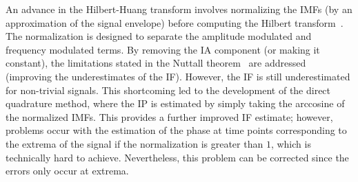 \documentclass[11pt,draftcls,onecolumn]{IEEEtran}
\begin{document}
An advance in the Hilbert-Huang transform involves normalizing the IMFs (by an approximation of the signal envelope) before computing the Hilbert transform~\cite{Huang2005}. The normalization is designed to separate the amplitude modulated and frequency modulated terms. By removing the IA component (or making it constant), the limitations stated in the Nuttall theorem~\cite{Nuttall1966} are addressed (improving the underestimates of the IF). However, the IF is still underestimated for non-trivial signals. This shortcoming led to the development of the direct quadrature method, where the IP is estimated by simply taking the arccosine of the normalized IMFs. This provides a further improved IF estimate; however, problems occur with the estimation of the phase at time points corresponding to the extrema of the signal if the normalization is greater than $1$, which is technically hard to achieve. Nevertheless, this problem can be corrected since the errors only occur at extrema.
\end{document}
